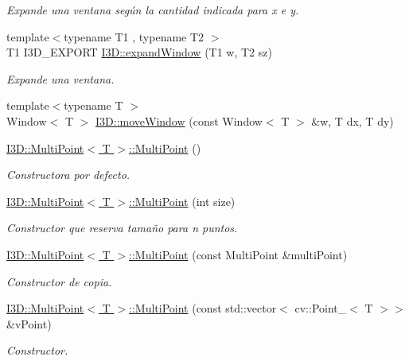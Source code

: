 \begin{DoxyCompactItemize}
\begin{DoxyCompactList}\small\item\em Expande una ventana según la cantidad indicada para x e y. \end{DoxyCompactList}\item 
{\footnotesize template$<$typename T1 , typename T2 $>$ }\\T1 I3\+D\+\_\+\+E\+X\+P\+O\+RT \hyperlink{group___geometric_entities_ga857396c24d042125f346f288db8e1fa2}{I3\+D\+::expand\+Window} (T1 w, T2 sz)
\begin{DoxyCompactList}\small\item\em Expande una ventana. \end{DoxyCompactList}\item 
{\footnotesize template$<$typename T $>$ }\\Window$<$ T $>$ \hyperlink{group___geometric_entities_ga5893c61910bdaf13dcbd435f1914d868}{I3\+D\+::move\+Window} (const Window$<$ T $>$ \&w, T dx, T dy)
\item 
\hyperlink{group___geometric_entities_ga15cd19a3ddf5a39c3154efe440dde6c7}{I3\+D\+::\+Multi\+Point$<$ T $>$\+::\+Multi\+Point} ()
\begin{DoxyCompactList}\small\item\em Constructora por defecto. \end{DoxyCompactList}\item 
\hyperlink{group___geometric_entities_ga5581044092b6db2870f35347c8af5b73}{I3\+D\+::\+Multi\+Point$<$ T $>$\+::\+Multi\+Point} (int size)
\begin{DoxyCompactList}\small\item\em Constructor que reserva tamaño para n puntos. \end{DoxyCompactList}\item 
\hyperlink{group___geometric_entities_gaadc33d9d15e6fe63040915f1f39d9b40}{I3\+D\+::\+Multi\+Point$<$ T $>$\+::\+Multi\+Point} (const Multi\+Point \&multi\+Point)
\begin{DoxyCompactList}\small\item\em Constructor de copia. \end{DoxyCompactList}\item 
\hyperlink{group___geometric_entities_ga4f8daff9e4ffbfcb5f1cc670f4e3681c}{I3\+D\+::\+Multi\+Point$<$ T $>$\+::\+Multi\+Point} (const std\+::vector$<$ cv\+::\+Point\+\_\+$<$ T $>$$>$ \&v\+Point)
\begin{DoxyCompactList}\small\item\em Constructor. \end{DoxyCompactList}\item 
$$
\end{DoxyCompactItemize}
